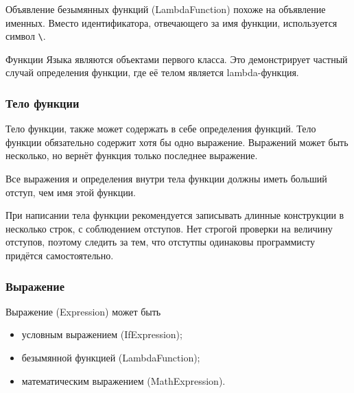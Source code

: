             Объявление безымянных функций (LambdaFunction) похоже на объявление именных.
            Вместо идентификатора, отвечающего за имя функции, используется символ \verb,\,.

            

            Функции Языка являются объектами первого класса.
            Это демонстрирует частный случай определения функции, где её телом является lambda-функция.

        \subsubsection{Тело функции}
            Тело функции, также может содержать в себе определения функций.
            Тело функции обязательно содержит хотя бы одно выражение.
            Выражений может быть несколько, но вернёт функция только последнее выражение.

            Все выражения и определения внутри тела функции должны иметь больший отступ, чем имя этой функции.

            При написании тела функции рекомендуется записывать длинные конструкции в несколько строк, с соблюдением отступов.
            Нет строгой проверки на величину отступов, поэтому следить за тем, что отстутпы одинаковы программисту придётся самостоятельно.

            

        \subsubsection{Выражение}
            Выражение (Expression) может быть
            \begin{itemize}
                \item условным выражением (IfExpression);
                \item безымянной функцией (LambdaFunction);
                \item математическим выражением (MathExpression).
            \end{itemize}

            

